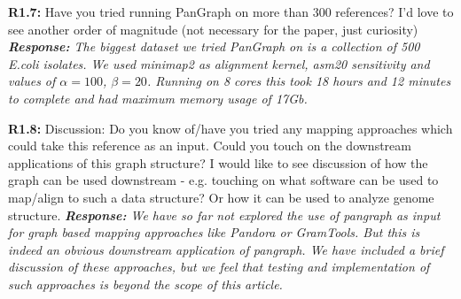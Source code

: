\documentclass[aps,rmp,onecolumn]{revtex4-1}
\newcommand{\Marco}[1]{{\color{gray}Marco: #1}}
\newcommand{\Liam}[1]{{\color{teal}Liam: #1}}
\newcommand{\reviewer}[2]{\textbf{#1:} #2\vskip 5mm}
\newcommand{\response}[1]{{\it {\color{response}\textbf{Response:} #1}}\vskip 5mm}
\begin{document}
\reviewer{R1.7}{Have you tried running PanGraph on more than 300 references? I'd love to see another order of magnitude (not necessary for the paper, just curiosity)}
\response{The biggest dataset we tried PanGraph on is a collection of 500 E.coli isolates. We used minimap2 as alignment kernel, asm20 sensitivity and values of $\alpha = 100$, $\beta=20$. Running on 8 cores this took 18 hours and 12 minutes to complete and had maximum memory usage of 17Gb.}

\reviewer{R1.8}{Discussion: Do you know of/have you tried any mapping approaches which could take this reference as an input. Could you touch on the downstream applications of this graph structure? I would like to see discussion of how the graph can be used downstream - e.g. touching on what software can be used to map/align to such a data structure? Or how it can be used to analyze genome structure.}
\response{We have so far not explored the use of pangraph as input for graph based mapping approaches like Pandora or GramTools. But this is indeed an obvious downstream application of pangraph. We have included a brief discussion of these approaches, but we feel that testing and implementation of such approaches is beyond the scope of this article.}
\end{document}
